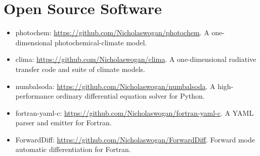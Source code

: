 \documentclass{article}
\begin{document}
\section{Open Source Software}

\begin{itemize}
  \item photochem: \url{https://github.com/Nicholaswogan/photochem}. A one-dimensional photochemical-climate model.
  \item clima: \url{https://github.com/Nicholaswogan/clima}. A one-dimensional radiative transfer code and suite of climate models. 
  \item numbalsoda: \url{https://github.com/Nicholaswogan/numbalsoda}. A high-performance ordinary differential equation solver for Python.
  \item fortran-yaml-c: \url{https://github.com/Nicholaswogan/fortran-yaml-c}. A YAML parser and emitter for Fortran.
  \item ForwardDiff: \url{https://github.com/Nicholaswogan/ForwardDiff}. Forward mode automatic differentiation for Fortran.
\end{itemize}
\end{document}
